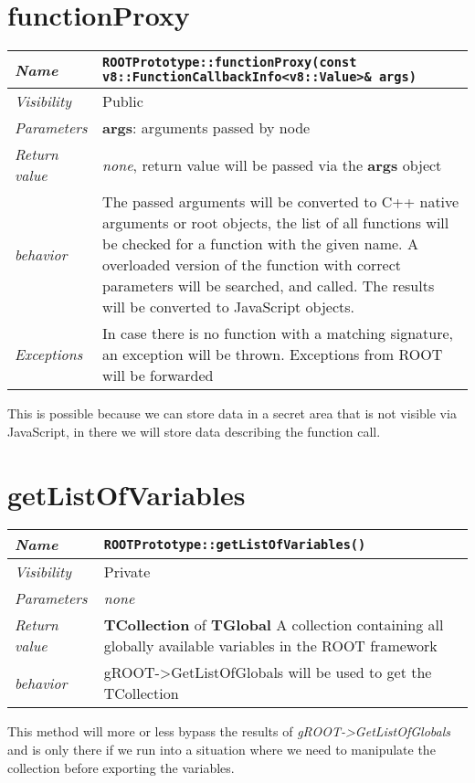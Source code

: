 \section{functionProxy}
\begin{longtable}{p{3cm} @{\hskip 1cm} p{12cm}}
  \hline
  \textit{Name} & \texttt{ROOTPrototype::functionProxy(const v8::FunctionCallbackInfo<v8::Value>\& args)} \\
  \hline
  \textit{Visibility} & Public \\
  \hline
  \textit{Parameters} & \textbf{args}: arguments passed by node \\
  \hline
  \textit{Return value} & \textit{none}, return value will be passed via the \textbf{args} object \\
  \hline
  \textit{behavior} & The passed arguments will be converted to C++ native arguments or root objects, the list of all functions will be checked for a function with the given name. 
  A overloaded version of the function with correct parameters will be searched, and called. The results will be converted to JavaScript objects. \\
  \hline
  \textit{Exceptions} & In case there is no function with a matching signature, an exception will be thrown.
  Exceptions from ROOT will be forwarded \\
  \hline
\end{longtable}
This is possible because we can store data in a secret area that is not visible via JavaScript, in there we will store data describing the function call.
\newpage
\section{getListOfVariables}
\begin{longtable}{p{3cm} @{\hskip 1cm} p{12cm}}
  \hline
  \textit{Name} & \texttt{ROOTPrototype::getListOfVariables()} \\
  \hline
  \textit{Visibility} & Private \\
  \hline
  \textit{Parameters} & \textit{none} \\
  \hline
  \textit{Return value} & \textbf{TCollection} of \textbf{TGlobal} A collection containing all globally available variables in the ROOT framework \\
  \hline
  \textit{behavior} & gROOT->GetListOfGlobals will be used to get the TCollection \\
  \hline
\end{longtable}
This method will more or less bypass the results of \textit{gROOT->GetListOfGlobals} and is only there if we run into a situation where we need to manipulate the collection before exporting the variables.
\newpage

